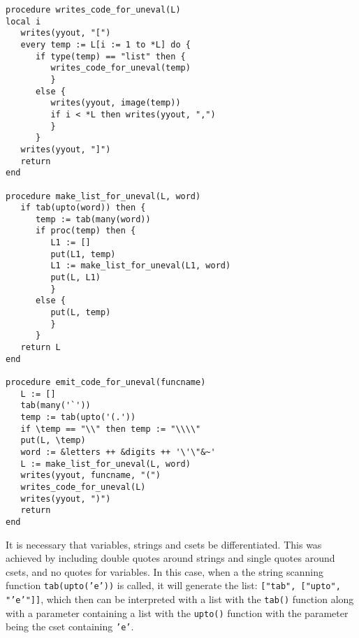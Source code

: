 \documentclass{article}
\begin{document}
\begin{verbatim}
procedure writes_code_for_uneval(L)
local i
   writes(yyout, "[")
   every temp := L[i := 1 to *L] do {
      if type(temp) == "list" then {
         writes_code_for_uneval(temp)
         } 
      else {
         writes(yyout, image(temp))
         if i < *L then writes(yyout, ",")
         }
      }
   writes(yyout, "]")
   return
end

procedure make_list_for_uneval(L, word)
   if tab(upto(word)) then {
      temp := tab(many(word))
      if proc(temp) then {
         L1 := []
         put(L1, temp)
         L1 := make_list_for_uneval(L1, word)
         put(L, L1)
         }
      else {
         put(L, temp)
         }
      }
   return L
end

procedure emit_code_for_uneval(funcname)
   L := []
   tab(many('`'))
   temp := tab(upto('(.')) 
   if \temp == "\\" then temp := "\\\\"
   put(L, \temp)
   word := &letters ++ &digits ++ '\'\"&~'
   L := make_list_for_uneval(L, word)
   writes(yyout, funcname, "(")
   writes_code_for_uneval(L)
   writes(yyout, ")")
   return
end
\end{verbatim}
It is necessary that variables, strings and csets be differentiated.  This was achieved by including double quotes around strings and single quotes around csets, and no quotes for variables.  In this case, when a the string scanning function \texttt{tab(upto('e'))} is called, it will generate the list: \texttt{["tab", ["upto", "'e'"]]}, which then can be interpreted with a list with the \texttt{tab()} function along with a parameter containing a list with the \texttt{upto()} function with the parameter being the cset containing \texttt{'e'}.
\end{document}
